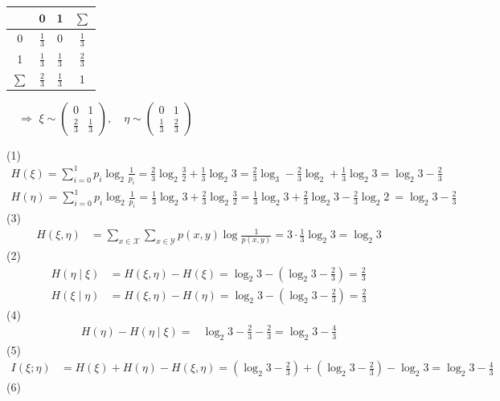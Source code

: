\begin{tcolorbox}[breakable,colback=blue!5!white,colframe=blue!75!black,
 title= 2024-03-11]
\tcblower
\begin{center}
     \begin{tabular}{|c|cc|c|}
\hline\diagbox{$ \eta $}{$ \xi $} & 0 & 1 & $ \sum $ \\
\hline 0 & $ \frac{1}{3} $ & 0 & $ \frac{1}{3} $ \\
\hline 1 & $ \frac{1}{3} $ & $ \frac{1}{3} $ & $ \frac{2}{3} $ \\
\hline$ \sum $ & $ \frac{2}{3} $ & $ \frac{1}{3} $ & 1 \\
\hline
\end{tabular}$\quad\Longrightarrow$
$
\xi \sim\left(\begin{array}{cc}
0 & 1 \\
\frac{2}{3} & \frac{1}{3}
\end{array}\right), \quad \eta \sim\left(\begin{array}{cc}
0 & 1 \\
\frac{1}{3} & \frac{2}{3}
\end{array}\right)
$
\end{center}
(1)
$$
\begin{aligned}
H(\xi)  =\sum_{i=0}^{1} p_{i} \log_2 \frac{1}{p_{i}}=\frac{2}{3} \log_2 \frac{3}{2}+\frac{1}{3} \log_2 3 =\frac{2}{3} \log_ 3-\frac{2}{3} \log_ 2+\frac{1}{3} \log_2 3  =\log_2 3-\frac{2}{3}
\end{aligned}
$$
$$
\begin{aligned}
H(\eta)  =\sum_{i=0}^{1} p_{i} \log_2 \frac{1}{p_{i}}=\frac{1}{3} \log_2 3+\frac{2}{3} \log_2 \frac{3}{2}  =\frac{1}{3} \log_2 3+\frac{2}{3} \log_2 3-\frac{2}{3} \log_2 2 \ =\log_2 3-\frac{2}{3}
\end{aligned}
$$
(3)
$$
\begin{aligned}
H(\xi, \eta) & =\sum_{x \in \mathscr{X}} \sum_{x \in \mathscr{Y}} p(x, y) \log \frac{1}{p(x, y)}  =3 \cdot \frac{1}{3} \log_2 3=\log_2 3
\end{aligned}
$$
(2)
$$
\begin{aligned}
H(\eta \mid \xi) & =H(\xi, \eta)-H(\xi)  =\log_2 3-\left(\log_2 3-\frac{2}{3}\right)=\frac{2}{3} \\
H(\xi \mid \eta) & =H(\xi, \eta)-H(\eta)  =\log_2 3-\left(\log_2 3-\frac{2}{3}\right)=\frac{2}{3}
\end{aligned}
$$
(4)
$$
\begin{aligned}
H(\eta)-H(\eta \mid \xi) 
= & \log_2 3-\frac{2}{3}-\frac{2}{3} =  \log_2 3-\frac{4}{3}
\end{aligned}
$$
(5)
$$
\begin{aligned}
I(\xi ; \eta) & =H(\xi)+H(\eta)-H(\xi, \eta)  =(\log_2 3-\frac{2}{3})+(\log_2 3-\frac{2}{3})-\log_2 3  =\log_2 3-\frac{4}{3}
\end{aligned}
$$
(6)


\end{tcolorbox}

